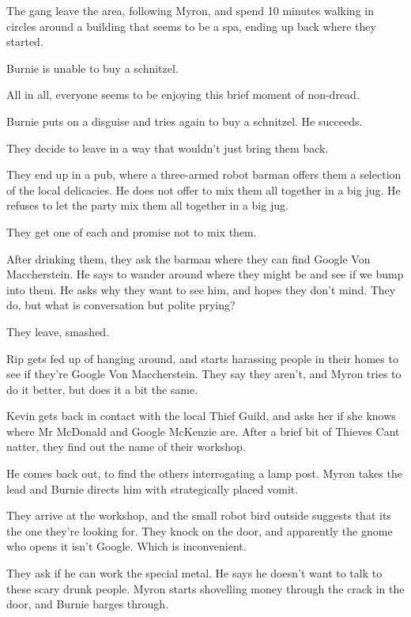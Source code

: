 The gang leave the area, following Myron, and spend 10 minutes walking in circles around a building that seems to be a spa, ending up back where they started.\medskip

Burnie is unable to buy a schnitzel.\medskip

All in all, everyone seems to be enjoying this brief moment of non-dread.\medskip

Burnie puts on a disguise and tries again to buy a schnitzel. He succeeds.\medskip

They decide to leave in a way that wouldn’t just bring them back.\medskip

They end up in a pub, where a three-armed robot barman offers them a selection of the local delicacies. He does not offer to mix them all together in a big jug. He refuses to let the party mix them all together in a big jug.\medskip

They get one of each and promise not to mix them.\medskip

After drinking them, they ask the barman where they can find Google Von Maccherstein. He says to wander around where they might be and see if we bump into them. He asks why they want to see him, and hopes they don’t mind. They do, but what is conversation but polite prying?\medskip

They leave, smashed.\medskip

Rip gets fed up of hanging around, and starts harassing people in their homes to see if they’re Google Von Maccherstein. They say they aren’t, and Myron tries to do it better, but does it a bit the same.\medskip

Kevin gets back in contact with the local Thief Guild, and asks her if she knows where Mr McDonald and Google McKenzie are. After a brief bit of Thieves Cant natter, they find out the name of their workshop.\medskip

He comes back out, to find the others interrogating a lamp post. Myron takes the lead and Burnie directs him with strategically placed vomit.\medskip

They arrive at the workshop, and the small robot bird outside suggests that its the one they’re looking for. They knock on the door, and apparently the gnome who opens it isn’t Google. Which is inconvenient.\medskip

They ask if he can work the special metal. He says he doesn’t want to talk to these scary drunk people. Myron starts shovelling money through the crack in the door, and Burnie barges through.\medskip

